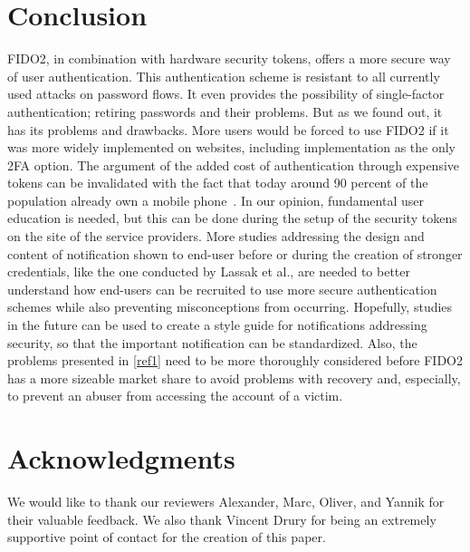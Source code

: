 \documentclass[runningheads]{llncs}
\begin{document}
\section{Conclusion}
FIDO2, in combination with hardware security tokens, offers a more secure way of user authentication. This authentication scheme is resistant to all currently used attacks on password flows. It even provides the possibility of single-factor authentication; retiring passwords and their problems. But as we found out, it has its problems and drawbacks. More users would be forced to use FIDO2 if it was more widely implemented on websites, including implementation as the only 2FA option. The argument of the added cost of authentication through expensive tokens can be invalidated with the fact that today around 90 percent of the population already own a mobile phone~\cite{000005}. In our opinion, fundamental user education is needed, but this can be done during the setup of the security tokens on the site of the service providers. More studies addressing the design and content of notification shown to end-user before or during the creation of stronger credentials, like the one conducted by Lassak et al., are needed to better understand how end-users can be recruited to use more secure authentication schemes while also preventing misconceptions from occurring. Hopefully, studies in the future can be used to create a style guide for notifications addressing security, so that the important notification can be standardized. Also, the problems presented in \ref{ref1} need to be more thoroughly considered before FIDO2 has a more sizeable market share to avoid problems with recovery and, especially, to prevent an abuser from accessing the account of a victim.

\section*{Acknowledgments}
We would like to thank our reviewers Alexander, Marc, Oliver, and Yannik for their valuable feedback. We also thank Vincent Drury for being an extremely
supportive point of contact for the creation of this paper.



\end{document}

